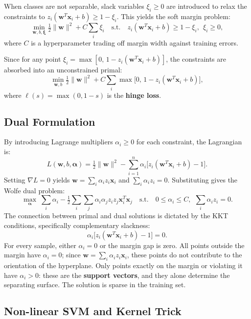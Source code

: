 When classes are not separable, slack variables $\xi_i\ge0$ are introduced to relax the constraints to $z_i(\mathbf{w}^T\mathbf{x}_i+b)\ge1-\xi_i$. This yields the soft margin problem:
\[
\min_{\mathbf{w},b,\boldsymbol\xi}\tfrac{1}{2}\|\mathbf{w}\|^2 + C\sum_i\xi_i \quad \text{s.t.} \quad z_i(\mathbf{w}^T\mathbf{x}_i+b)\ge1-\xi_i,\ \ \xi_i\ge0,
\]
where $C$ is a hyperparameter trading off margin width against training errors.

Since for any point $\xi_i=\max[0,\,1-z_i(\mathbf{w}^T\mathbf{x}_i+b)]$, the constraints are absorbed into an unconstrained primal:
\[
\min_{\mathbf{w},b}\tfrac{1}{2}\|\mathbf{w}\|^2 + C\sum_i\max\!\big[0,\,1-z_i(\mathbf{w}^T\mathbf{x}_i+b)\big],
\]
where $\ell(s)=\max(0,1-s)$ is the \textbf{hinge loss}.

\subsection*{Dual Formulation}

By introducing Lagrange multipliers $\alpha_i\ge0$ for each constraint, the Lagrangian is:
\[
L(\mathbf{w},b,\boldsymbol\alpha)=\tfrac{1}{2}\|\mathbf{w}\|^2-\sum_{i=1}^n\alpha_i\big[z_i(\mathbf{w}^T\mathbf{x}_i+b)-1\big].
\]
Setting $\nabla L=0$ yields $\mathbf{w}=\sum_i\alpha_iz_i\mathbf{x}_i$ and $\sum_i\alpha_iz_i=0$. Substituting gives the Wolfe dual problem:
\[
\max_{\boldsymbol\alpha}\;\sum_i\alpha_i - \tfrac{1}{2}\sum_i\sum_j\alpha_i\alpha_jz_iz_j\mathbf{x}_i^T\mathbf{x}_j \quad \text{s.t.} \quad 0\le\alpha_i\le C,\ \ \sum_i\alpha_iz_i=0.
\]
The connection between primal and dual solutions is dictated by the KKT conditions, specifically complementary slackness:
\[
\alpha_i\big[z_i(\mathbf{w}^T\mathbf{x}_i+b)-1\big]=0.
\]
For every sample, either $\alpha_i=0$ or the margin gap is zero. All points outside the margin have $\alpha_i=0$; since $\mathbf{w}=\sum_i\alpha_iz_i\mathbf{x}_i$, these points do not contribute to the orientation of the hyperplane. Only points exactly on the margin or violating it have $\alpha_i>0$: these are the \textbf{support vectors}, and they alone determine the separating surface. The solution is sparse in the training set.

\subsection*{Non-linear SVM and Kernel Trick}

